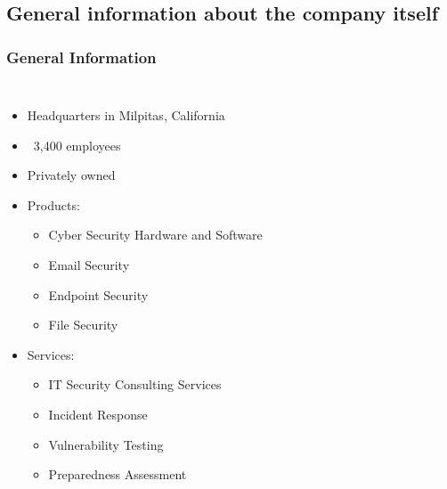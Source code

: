 \documentclass{beamer}
\begin{document}
	\subsection{General information about the company itself}
	\begin{frame}
		\frametitle{General Information}
		\begin{columns}
			\begin{itemize}
				\item Headquarters in Milpitas, California
				\item ~3,400 employees
				\item Privately owned
				\item Products:
				\begin{itemize}
					\item Cyber Security Hardware and Software
					\item Email Security
					\item Endpoint Security
					\item File Security
				\end{itemize}
				\item Services:
				\begin{itemize}
					\item IT Security Consulting Services
					\item Incident Response
					\item Vulnerability Testing
					\item Preparedness Assessment
				\end{itemize}
			\end{itemize}
			\begin{figure}

\end{figure}
\end{columns}
\end{frame}
\end{document}
